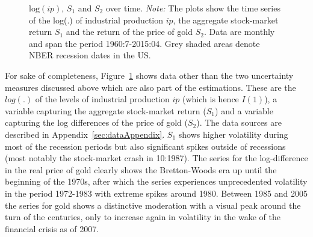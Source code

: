 \documentclass[a4paper,11pt,listof=nochaptergap,oneside,pointednumbers,bibtotoc,bigheadings,liststotoc,hidelinks]{scrbook}
\theoremstyle{mysatz}
\theoremstyle{mydefinition}
\theoremstyle{mytheorem}
\theoremstyle{mybemerkung}
\begin{document}
\begin{figure}[!ht]
   \centering
   \setlength\fboxsep{0pt}
   \setlength\fboxrule{0pt}
      \caption[$\text{log}(ip)$, $S_1$ and $S_2$ over time.]{$\text{log}(ip)$, $S_1$ and $S_2$ over time.
      \textit{Note:} The plots show the time series of the log(.) of industrial production $ip$, the aggregate stock-market return $S_1$ and the return of the price of gold $S_2$. Data are monthly and span the period 1960:7-2015:04. Grey shaded areas denote NBER recession dates in the US.}   \label{fig:plot_other_data}
\end{figure}

For sake of completeness, Figure~\ref{fig:plot_other_data} shows data other than the two uncertainty measures discussed above which are also part of the estimations. These are the $log(.)$ of the levels of industrial production $ip$ (which is hence $I(1)$), a variable capturing the aggregate stock-market return ($S_1$) and a variable capturing the log differences of the price of gold ($S_2$). The data sources are described in Appendix~\ref{sec:dataAppendix}. $S_1$ shows higher volatility during most of the recession periods but also significant spikes outside of recessions (most notably the stock-market crash in 10:1987). The series for the log-difference in the real price of gold clearly shows the Bretton-Woods era up until the beginning of the 1970s, after which the series experiences unprecedented volatility in the period 1972-1983 with extreme spikes around 1980. Between 1985 and 2005 the series for gold shows a distinctive moderation with a visual peak around the turn of the centuries, only to increase again in volatility in the wake of the financial crisis as of 2007.
\end{document}
